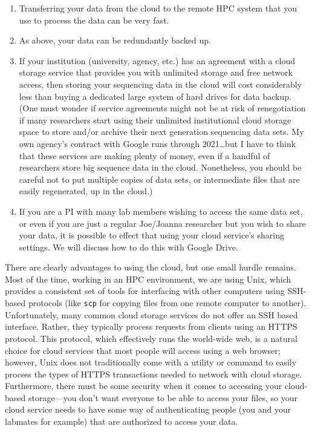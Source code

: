 \documentclass[]{krantz}
\providecommand{\tightlist}{%
  \setlength{\itemsep}{0pt}\setlength{\parskip}{0pt}}
\begin{document}
\begin{enumerate}
\def\labelenumi{\arabic{enumi}.}
\tightlist
\item
  Transferring your data from the cloud to the remote HPC system
  that you use to process the data can be very fast.
\item
  As above, your data can be redundantly backed up.
\item
  If your institution (university, agency, etc.) has an agreement with a cloud storage
  service that provides you with unlimited storage and free network access, then storing
  your sequencing data in the cloud will cost considerably less than buying a dedicated
  large system of hard drives for data backup. (One must wonder if service
  agreements might not be at risk of renegotiation if many researchers start using their
  unlimited institutional cloud storage space to store and/or archive their
  next generation sequencing data sets. My own agency's contract with Google runs
  through 2021\ldots{}but I have to think that these services are making plenty of money, even
  if a handful of researchers store big sequence data in the cloud. Nonetheless, you
  should be careful not to put multiple copies of data sets, or intermediate files that
  are easily regenerated, up in the cloud.)
\item
  If you are a PI with many lab members wishing to access the same data set, or even if
  you are just a regular Joe/Joanna researcher but you wish to share your data, it is
  possible to effect that using your cloud service's sharing settings. We will discuss
  how to do this with Google Drive.
\end{enumerate}

There are clearly advantages to using the cloud, but one small hurdle remains. Most
of the time, working in an HPC environment, we are using Unix, which provides a consistent
set of tools for interfacing with other computers using SSH-based protocols (like \texttt{scp}
for copying files from one remote computer to another). Unfortunately, many common
cloud storage services do not offer an SSH based interface. Rather, they typically process
requests from clients using an HTTPS protocol. This protocol, which effectively runs the
world-wide web, is a natural choice for cloud services that most people will access
using a web browser; however, Unix does not traditionally come with a utility or command
to easily process the types of HTTPS transactions needed to network with
cloud storage. Furthermore, there must be some security when it comes to accessing
your cloud-based storage---you don't want everyone to be able to access your files, so
your cloud service needs to have some way of authenticating people
(you and your labmates for example) that are authorized to access your data.
\end{document}
